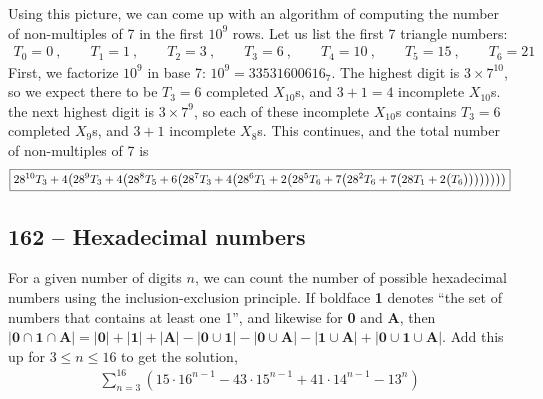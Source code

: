 \documentclass{article}
\begin{document}
Using this picture, we can come up with an algorithm of computing the number of non-multiples of 7 in the first $10^9$ rows.
Let us list the first 7 triangle numbers:
\begin{align*}
	T_0 = 0~, \qquad T_1 = 1~, \qquad T_2 = 3 ~, \qquad T_3 = 6 ~,\qquad T_4 = 10 ~,\qquad T_5 = 15 ~, \qquad T_6 = 21
\end{align*}
First, we factorize $10^9$ in base 7: $10^9 = 33531600616_7$.
The highest digit is $3 \times 7^{10}$, so we expect there to be $T_3 = 6$ completed $X_{10}$s, and $3+1 = 4$ incomplete $X_{10}$s.
the next highest digit is $3 \times 7^9$, so each of these incomplete $X_{10}$s contains $T_3 = 6$ completed $X_9$s, and $3+1$ incomplete $X_8$s.
This continues, and the total number of non-multiples of 7 is
\begin{align*}
	\boxed{ 28^{10} T_3 + 4 \qty( 28^9 T_3 + 4 \qty( 28^8 T_5 + 6 \qty( 28^7 T_3 + 4 \qty( 28^6 T_1 + 2 \qty( 28^5 T_6 + 7 \qty( 28^2 T_6 + 7 \qty\big( 28 T_1 + 2 \qty\big( T_6 )))))))) }
\end{align*}


\subsection*{162 -- Hexadecimal numbers}
For a given number of digits $n$, we can count the number of possible hexadecimal numbers using the inclusion-exclusion principle.
If boldface \textbf{1} denotes ``the set of numbers that contains at least one 1'', and likewise for \textbf{0} and \textbf{A}, then $|\mathbf{0} \cap \mathbf{1} \cap \mathbf{A}| = |\mathbf{0}| + |\mathbf{1}| + |\mathbf{A}| - |\mathbf{0} \cup \mathbf{1}| - |\mathbf{0} \cup \mathbf{A}| - |\mathbf{1} \cup \mathbf{A}| + |\mathbf{0} \cup \mathbf{1} \cup \mathbf{A}|$.
Add this up for $3 \leq n \leq 16$ to get the solution,
\begin{align*}
	\boxed{ \sum_{n=3}^{16} \left(15 \cdot 16^{n-1} - 43 \cdot 15^{n-1} + 41 \cdot 14^{n-1} - 13^n\right) }
\end{align*}
\end{document}
